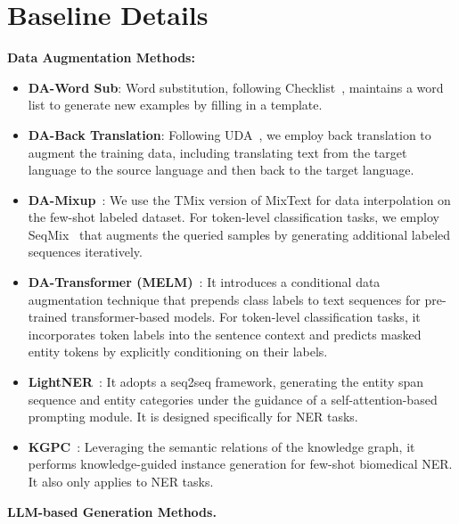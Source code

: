 \documentclass{article} %
\begin{document}
\section{Baseline Details}
\label{sec:baseline_details}
\textbf{Data Augmentation Methods:}
\begin{itemize}[leftmargin=0.5cm]
    \item \textbf{DA-Word Sub}: Word substitution, following Checklist~\citep{checklist}, maintains a word list to generate new examples by filling in a template. 
    \item \textbf{DA-Back Translation}: Following UDA~\citep{uda}, we employ back translation to augment the training data, including translating text from the target language to the source language and then back to the target language. 
    \item \textbf{DA-Mixup}~\citep{chen2020mixtext,seqmix}: We use the TMix version of MixText for data interpolation on the few-shot labeled dataset. For token-level classification tasks, we employ SeqMix~\citep{seqmix} that augments the queried samples by generating additional labeled sequences iteratively.
    \item \textbf{DA-Transformer (MELM)}~\citep{kumar2020data,melm}: It introduces a conditional data augmentation technique that prepends class labels to text sequences for pre-trained transformer-based models. For token-level classification tasks, it incorporates token labels into the sentence context and predicts masked entity tokens by explicitly conditioning on their labels.
    \item  \textbf{LightNER}~\citep{lightner}: It adopts a seq2seq framework, generating the entity span sequence and entity categories under the guidance of a self-attention-based prompting module. It is designed specifically for NER tasks.
    \item  \textbf{KGPC}~\citep{chen2023few}: Leveraging the semantic relations of the knowledge graph, it performs knowledge-guided instance generation for few-shot biomedical NER. It also only applies to NER tasks.
\end{itemize}


\textbf{LLM-based Generation Methods.} 
\end{document}
